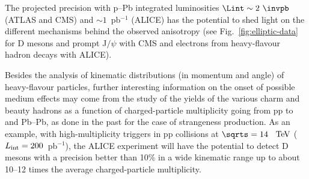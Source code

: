 The projected precision with p--Pb integrated luminosities $\Lint\sim 2~\invpb$  (ATLAS and CMS) and $\sim 1$~pb$^{-1}$ (ALICE) has the potential to shed light on the different mechanisms behind the observed anisotropy (see Fig.~\ref{fig:elliptic-data} for D mesons and prompt J$/\psi$ with CMS and electrons from heavy-flavour hadron decays with ALICE).


Besides the analysis of kinematic distributions (in momentum and angle) of heavy-flavour particles, further interesting information on the onset of possible medium effects may come from the study of the yields of the various charm and beauty hadrons as a function of charged-particle multiplicity going from pp to \pPb and Pb--Pb, as done in the past for the case of strangeness production. As an example, with high-multiplicity triggers in pp collisions at $\sqrts =14$~$~\text{TeV}$ ($L_{\rm int}=200$~pb$^{-1}$), the ALICE experiment will have the potential to detect D mesons with a precision better than 10\% in a wide kinematic range up to about 10--12 times the average charged-particle multiplicity. 







